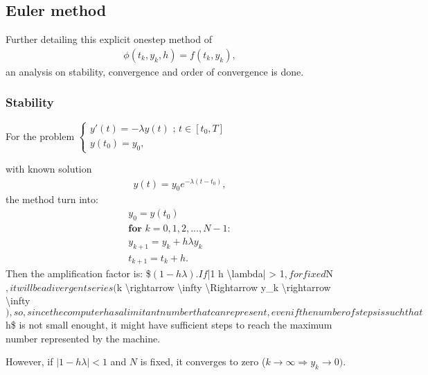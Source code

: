 \documentclass[letterpaper,10pt,english]{jupyterBook}
\begin{document}
\subsection{Euler method}
\label{\detokenize{cap2:euler-method}}
\sphinxAtStartPar
Further detailing this explicit one\sphinxhyphen{}step method of
\begin{equation*}
\begin{split}
    \phi (t_{k},y_{k},h) = f(t_{k},y_{k}),
\end{split}
\end{equation*}
\sphinxAtStartPar
an analysis on stability, convergence and order of convergence is done.


\subsubsection{Stability}
\label{\detokenize{cap2:stability}}
\sphinxAtStartPar
For the problem
\(\begin{cases}
    y'(t) = - \lambda y(t) \text{ ; } t \in [t_0 , T] \\
    y(t_0)=y_0,
\end{cases}\)

\sphinxAtStartPar
with known solution
\begin{equation*}
\begin{split} y(t) = y_0e^{-\lambda (t-t_0)},\end{split}
\end{equation*}
\sphinxAtStartPar
the method turn into:
\begin{equation*}
\begin{split}
y_0 = y(t_0)\\
\textbf{for } k = 0, 1, 2, ..., N-1 :\\
    y_{k+1} = y_k + h \lambda y_k \\
    t_{k+1} = t_k + h.
\end{split}
\end{equation*}
\sphinxAtStartPar
Then the amplification factor is:
\$\(
(1 - h \lambda).
\)\(
If \)|1 \sphinxhyphen{} h \textbackslash{}lambda| > 1\(, for fixed \)N\(, it will be a divergent series (\)k \textbackslash{}rightarrow \textbackslash{}infty \textbackslash{}Rightarrow y\_k \textbackslash{}rightarrow \textbackslash{}infty \(), so, since the computer has a limitant number that can represent, even if the number of steps is such that \)h\$ is not small enought, it might have sufficient steps to reach the maximum number represented by the machine.

\sphinxAtStartPar
However, if \(|1 - h \lambda| < 1\) and \(N\) is fixed, it converges to zero (\(k \rightarrow \infty \Rightarrow y_k \rightarrow 0 )\).
\end{document}
